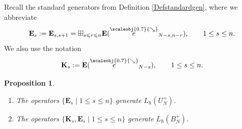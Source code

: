 \documentclass[11pt, reqno]{amsart}
\newtheorem{prop}[theorem]{Proposition}
\theoremstyle{definition}
\numberwithin{equation}{section}
\def\le{\leqslant}
\newcommand{\eb}{\mathbf{E}}
\newcommand{\Nilp}{U}
\newcommand{\Bor}{B}
\newcommand{\sears}{\scaleobj{0.7}{\searrow}}
\newcommand{\seee}{\overset{\sears}{e}}
\newcommand{\Kb}{\mathbf{K}}
\def\stgE{\mathbf{E}}
\begin{document}
Recall the standard generators from Definition \ref{Defstandardgen}, where we abbreviate
\begin{equation}\label{EqGenEs}
\stgE_s := \stgE_{s,s+1} =  \boxplus_{s \le r \le n} \eb(\seee_{N-s,n-r}),\qquad 1\leq s\leq n.
\end{equation}
We also use the notation 
\begin{equation}\label{EqCartanK}
\Kb_s := \eb(\seee_{N-s}),\qquad 1\leq s \leq n.
\end{equation}

\begin{prop}\label{PropStandardGen}
\begin{enumerate}
\item
The operators $\{\stgE_s\mid 1\leq s\leq n\}$ generate $L_{\hbar}(\Nilp_N^+)$.
\item The operators $\{\Kb_s,\stgE_s\mid 1\leq s \leq n\}$ generate $L_{\hbar}(\Bor_N^+)$.
\end{enumerate}
\end{prop} 
\end{document}
